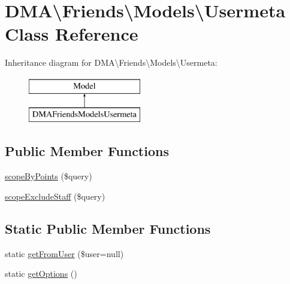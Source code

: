 \hypertarget{classDMA_1_1Friends_1_1Models_1_1Usermeta}{}\section{D\+M\+A\textbackslash{}Friends\textbackslash{}Models\textbackslash{}Usermeta Class Reference}
\label{classDMA_1_1Friends_1_1Models_1_1Usermeta}
Inheritance diagram for D\+M\+A\textbackslash{}Friends\textbackslash{}Models\textbackslash{}Usermeta\+:\begin{figure}[H]
\begin{center}
\leavevmode
\includegraphics[height=2.000000cm]{d6/d87/classDMA_1_1Friends_1_1Models_1_1Usermeta}
\end{center}
\end{figure}
\subsection*{Public Member Functions}
\begin{DoxyCompactItemize}
\item 
\hyperlink{classDMA_1_1Friends_1_1Models_1_1Usermeta_ae00ecaf0d62b1ac7adc77184ae2fcbfa}{scope\+By\+Points} (\$query)
\item 
\hyperlink{classDMA_1_1Friends_1_1Models_1_1Usermeta_a9b2ffa9c768ce6346269295d54d5cf4b}{scope\+Exclude\+Staff} (\$query)
\end{DoxyCompactItemize}
\subsection*{Static Public Member Functions}
\begin{DoxyCompactItemize}
\item 
static \hyperlink{classDMA_1_1Friends_1_1Models_1_1Usermeta_a9cfb688f15d66ee5a34c6437316d5d71}{get\+From\+User} (\$user=null)
\item 
static \hyperlink{classDMA_1_1Friends_1_1Models_1_1Usermeta_a1acccb846d0ba68fcc9694cc0b1c4006}{get\+Options} ()
\end{DoxyCompactItemize}
